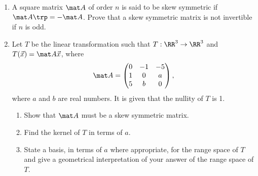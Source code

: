 \clearpage
\begin{problem}
    \begin{enumerate}
        \item A square matrix $\mat A$ of order $n$ is said to be skew symmetric if $\mat A \trp = - \mat A$. Prove that a skew symmetric matrix is not invertible if $n$ is odd.
        \item Let $T$ be the linear transformation such that $T : \RR^3 \to \RR^3$ and $T(\vec x) = \mat A \vec x$, where \[\mat A = \begin{pmatrix}0 & -1 & -5 \\ 1 & 0 & a \\ 5 & b & 0\end{pmatrix},\] where $a$ and $b$ are real numbers. It is given that the nullity of $T$ is 1.
        \begin{enumerate}
            \item Show that $\mat A$ must be a skew symmetric matrix.
            \item Find the kernel of $T$ in terms of $a$.
            \item State a basis, in terms of $a$ where appropriate, for the range space of $T$ and give a geometrical interpretation of your answer of the range space of $T$.
        \end{enumerate}
    \end{enumerate}
\end{problem}
